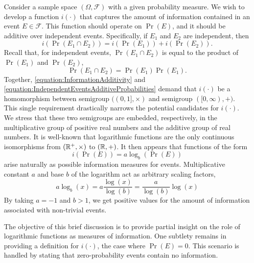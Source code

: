 Consider a sample space $(\Omega, \mathcal{F})$ with a given probability measure.
We wish to develop a function $i(\cdot)$ that captures the amount of information contained in an event $E \in \mathcal{F}$.
This function should operate on $\Pr(E)$, and it should be additive over independent events.
Specifically, if $E_1$ and $E_2$ are independent, then
\begin{equation} \label{equation:InformationAdditivity}
i \left( \Pr (E_1 \cap E_2) \right)
= i \left( \Pr (E_1) \right) + i \left( \Pr (E_2) \right) .
\end{equation}
Recall that, for independent events, $\Pr(E_1 \cap E_2)$ is equal to the product of $\Pr(E_1)$ and $\Pr(E_2)$,
\begin{equation} \label{equation:IndependentEventsAdditiveProbabilities}
\Pr (E_1 \cap E_2) = \Pr (E_1) \Pr (E_1) .
\end{equation}
Together, \eqref{equation:InformationAdditivity} and \eqref{equation:IndependentEventsAdditiveProbabilities} demand that $i(\cdot)$ be a homomorphism between semigroup $((0,1], \times)$ and semigroup $( [0, \infty), +)$. 
This single requirement drastically narrows the potential candidates for $i(\cdot)$.
We stress that these two semigroups are embedded, respectively, in the multiplicative group of positive real numbers and the additive group of real numbers.
It is well-known that logarithmic functions are the only continuous isomorphisms from $(\mathbb{R}^+, \times)$ to $(\mathbb{R}, +)$.
It then appears that functions of the form
\begin{equation*}
i \left( \Pr (E) \right) = a \log_b \left( \Pr (E) \right)
\end{equation*}
arise naturally as possible information measures for events.
Multiplicative constant $a$ and base $b$ of the logarithm act as arbitrary scaling factors,
\begin{equation*}
a \log_b ( x ) = a \frac{ \log ( x ) }{ \log ( b) }
= \frac{a}{ \log (b) } \log ( x )
\end{equation*}
By taking $a = -1$ and $b > 1$, we get positive values for the amount of information associated with non-trivial events.

The objective of this brief discussion is to provide partial insight on the role of logarithmic functions as measures of information.
One subtlety remains in providing a definition for $i(\cdot)$, the case where $\Pr (E) = 0$.
This scenario is handled by stating that zero-probability events contain no information.


